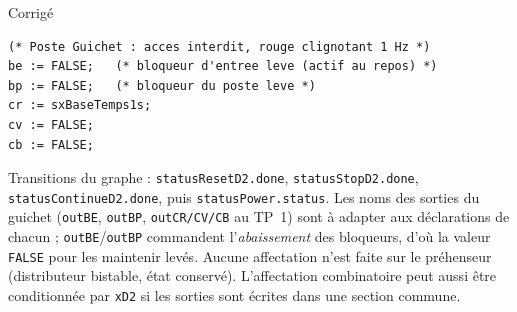 \begin{UPSTIactivite}
\begin{UPSTIcorrectionP}{Corrigé}
\begin{lstlisting}
(* Poste Guichet : acces interdit, rouge clignotant 1 Hz *)
be := FALSE;   (* bloqueur d'entree leve (actif au repos) *)
bp := FALSE;   (* bloqueur du poste leve *)
cr := sxBaseTemps1s;
cv := FALSE;
cb := FALSE;
\end{lstlisting}
Transitions du graphe : \texttt{statusResetD2.done},
\texttt{statusStopD2.done},
\texttt{statusContinueD2.done}, puis
\texttt{statusPower.status}. Les noms des sorties du guichet
(\texttt{outBE}, \texttt{outBP}, \texttt{outCR/CV/CB} au TP~1) sont à
adapter aux déclarations de chacun ; \texttt{outBE}/\texttt{outBP}
commandent l'\emph{abaissement} des bloqueurs, d'où la valeur
\texttt{FALSE} pour les maintenir levés. Aucune affectation n'est faite sur
le préhenseur (distributeur bistable, état conservé). L'affectation
combinatoire peut aussi être conditionnée par \texttt{xD2} si les sorties
sont écrites dans une section commune.
\end{UPSTIcorrectionP}
\end{UPSTIactivite}
